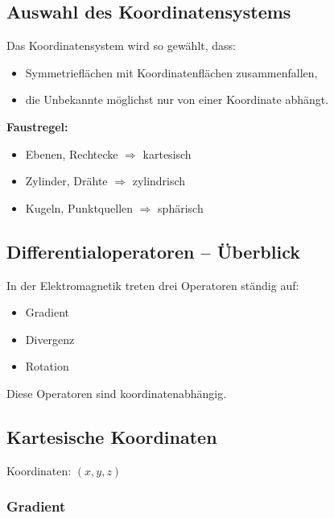 \documentclass[a4paper]{article}
\newcommand{\imp}[1]{{\color{accent}\bfseries #1}}
\begin{document}
\subsection{Auswahl des Koordinatensystems}

Das Koordinatensystem wird so gewählt, dass:
\begin{itemize}
  \item Symmetrieflächen mit Koordinatenflächen zusammenfallen,
  \item die Unbekannte möglichst nur von einer Koordinate abhängt.
\end{itemize}

\begin{schema}
\imp{Faustregel:}
\begin{itemize}
  \item Ebenen, Rechtecke $\Rightarrow$ kartesisch
  \item Zylinder, Drähte $\Rightarrow$ zylindrisch
  \item Kugeln, Punktquellen $\Rightarrow$ sphärisch
\end{itemize}
\end{schema}

\subsection{Differentialoperatoren – Überblick}

In der Elektromagnetik treten drei Operatoren ständig auf:
\begin{itemize}
  \item Gradient
  \item Divergenz
  \item Rotation
\end{itemize}

Diese Operatoren sind koordinatenabhängig.

\subsection{Kartesische Koordinaten}

Koordinaten: $(x,y,z)$

\subsubsection{Gradient}
\end{document}
